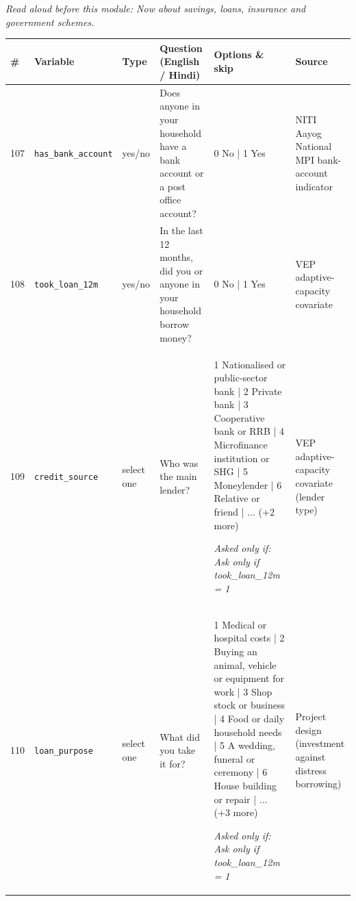 \documentclass[9pt,a4paper,landscape]{article}
\begin{document}
{\small\itshape Read aloud before this module: Now about savings, loans, insurance and government schemes.}\\[5pt]
\begin{longtable}{@{}p{0.5cm}p{3.3cm}p{1.7cm}p{7.3cm}p{5.6cm}p{5.4cm}@{}}
\toprule \footnotesize\textbf{\#} & \footnotesize\textbf{Variable} & \footnotesize\textbf{Type} & \footnotesize\textbf{Question (English / Hindi)} & \footnotesize\textbf{Options {\&} skip} & \footnotesize\textbf{Source}\\ \midrule
\endhead
\footnotesize 107 & \footnotesize\texttt{has\_bank\_account} & \scriptsize yes/no & \footnotesize Does anyone in your household have a bank account or a post office account?\par\vspace{1pt}{\footnotesize\color{hdr}{\hifont क्या आपके घर में किसी का बैंक खाता या डाकघर का खाता है?}} & \scriptsize 0 No | 1 Yes & \scriptsize NITI Aayog National MPI bank-account indicator\\
\footnotesize 108 & \footnotesize\texttt{took\_loan\_12m} & \scriptsize yes/no & \footnotesize In the last 12 months, did you or anyone in your household borrow money?\par\vspace{1pt}{\footnotesize\color{hdr}{\hifont पिछले 12 महीनों में क्या आपने या आपके घर के किसी सदस्य ने पैसा उधार लिया?}} & \scriptsize 0 No | 1 Yes & \scriptsize VEP adaptive-capacity covariate\\
\footnotesize 109 & \footnotesize\texttt{credit\_source} & \scriptsize select one & \footnotesize Who was the main lender?\par\vspace{1pt}{\footnotesize\color{hdr}{\hifont मुख्य रूप से किससे उधार लिया?}} & \scriptsize 1 Nationalised or public-sector bank | 2 Private bank | 3 Cooperative bank or RRB | 4 Microfinance institution or SHG | 5 Moneylender | 6 Relative or friend | ... (+2 more)\par\vspace{1pt}\textit{Asked only if: Ask only if took\_loan\_12m = 1} & \scriptsize VEP adaptive-capacity covariate (lender type)\\
\footnotesize 110 & \footnotesize\texttt{loan\_purpose} & \scriptsize select one & \footnotesize What did you take it for?\par\vspace{1pt}{\footnotesize\color{hdr}{\hifont वह क़र्ज़ आपने किस काम के लिए लिया था?}} & \scriptsize 1 Medical or hospital costs | 2 Buying an animal, vehicle or equipment for work | 3 Shop stock or business | 4 Food or daily household needs | 5 A wedding, funeral or ceremony | 6 House building or repair | ... (+3 more)\par\vspace{1pt}\textit{Asked only if: Ask only if took\_loan\_12m = 1} & \scriptsize Project design (investment against distress borrowing)\\

\end{longtable}
\end{document}
